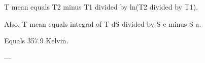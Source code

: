 T mean equals T2 minus T1 divided by ln(T2 divided by T1).  

Also, T mean equals integral of T dS divided by S e minus S a.  

Equals 357.9 Kelvin.  

---
